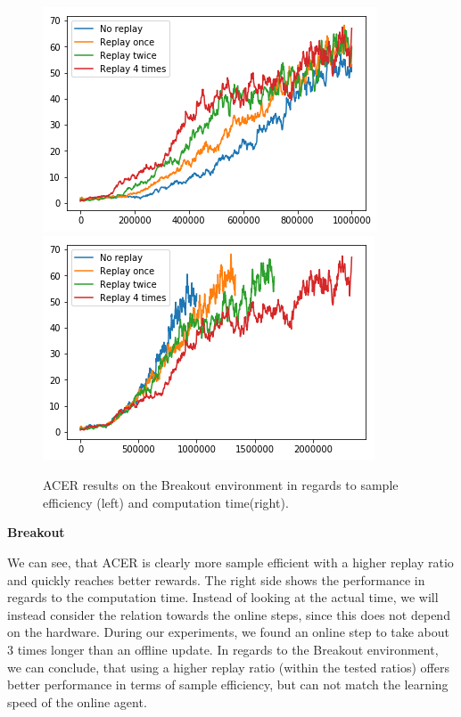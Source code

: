 \begin{figure}[h]
\includegraphics[scale=0.55]{bilder/breakoutbyonline.png}
\includegraphics[scale=0.55]{bilder/breakoutbytime.png}
\caption{ACER results on the Breakout environment in regards to sample efficiency (left) and computation time(right).}
\end{figure}
\textbf{Breakout}

We can see, that ACER is clearly more sample efficient with a higher replay ratio and quickly reaches better rewards. 
The right side shows the performance in regards to the computation time. Instead of looking at the actual time, we will instead consider the relation towards the online steps, since this does not depend on the hardware. During our experiments,  we found an online step to take about 3 times longer than an offline update.
In regards to the Breakout environment, we can conclude, that using a higher replay ratio (within the tested ratios) offers better performance in terms of sample efficiency, but can not match the learning speed of the online agent.


